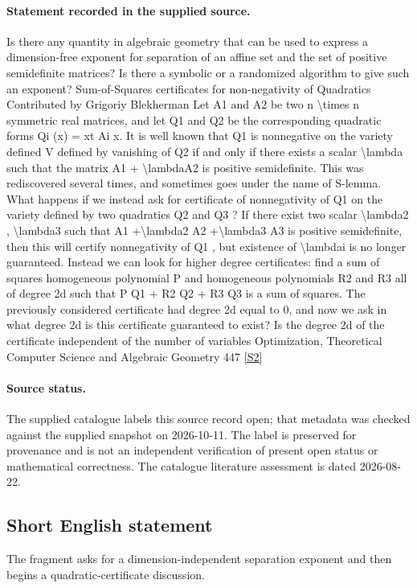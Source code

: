 \documentclass[11pt]{article}
\newcommand{\sref}[2]{\hyperlink{source:#1:#2}{[S#2]}}
\begin{document}
\paragraph{Statement recorded in the supplied source.}
Is there any quantity in algebraic geometry that can be used to express a dimension-free exponent for separation of an aﬃne set and the set of positive semideﬁnite matrices? Is there a symbolic or a randomized algorithm to give such an exponent? Sum-of-Squares certificates for non-negativity of Quadratics Contributed by Grigoriy Blekherman Let A1 and A2 be two n \textbackslash{}times n symmetric real matrices, and let Q1 and Q2 be the corresponding quadratic forms Qi (x) = xt Ai x. It is well known that Q1 is nonnegative on the variety deﬁned V deﬁned by vanishing of Q2 if and only if there exists a scalar \textbackslash{}lambda such that the matrix A1 + \textbackslash{}lambdaA2 is positive semideﬁnite. This was rediscovered several times, and sometimes goes under the name of S-lemma. What happens if we instead ask for certiﬁcate of nonnegativity of Q1 on the variety deﬁned by two quadratics Q2 and Q3 ? If there exist two scalar \textbackslash{}lambda2 , \textbackslash{}lambda3 such that A1 +\textbackslash{}lambda2 A2 +\textbackslash{}lambda3 A3 is positive semideﬁnite, then this will certify nonnegativity of Q1 , but existence of \textbackslash{}lambdai is no longer guaranteed. Instead we can look for higher degree certificates: ﬁnd a sum of squares homogeneous polynomial P and homogeneous polynomials R2 and R3 all of degree 2d such that P Q1 + R2 Q2 + R3 Q3 is a sum of squares. The previously considered certiﬁcate had degree 2d equal to 0, and now we ask in what degree 2d is this certiﬁcate guaranteed to exist? Is the degree 2d of the certiﬁcate independent of the number of variables Optimization, Theoretical Computer Science and Algebraic Geometry 447 \sref{statement}{2}
\paragraph{Source status.}
The supplied catalogue labels this source record open; that metadata was checked against the supplied snapshot on 2026-10-11. The label is preserved for provenance and is not an independent verification of present open status or mathematical correctness. The catalogue literature assessment is dated 2026-08-22.
\subsection{Short English statement}
The fragment asks for a dimension-independent separation exponent and then begins a quadratic-certificate discussion.
\end{document}
